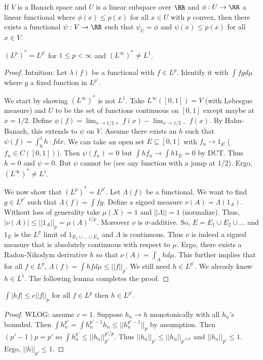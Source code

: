 \documentclass{../uva7310}
\begin{document}
\begin{thm}
    If $V$ is a Banach space and $U$ is a linear subspace over $\RR$ and $\phi:U\rightarrow\RR$ a linear functional
    where $\phi(x)\leq p(x)$ for all $x\in U$ with $p$ convex, then there exists a functional $\psi:V\rightarrow\RR$ such that
    $\psi_U=\phi$ and $\psi(x)\leq p(x)$ for all $x\in V$. 
\end{thm}

\begin{thm}
    $(L^p)^*=L^{p'}$ for $1\leq p<\infty$ and $(L^\infty)^*\neq L^1$.
\end{thm}

\begin{proof}
    Intuition: Let $\lambda(f)$ be a functional with $f\in L^p$. Identify it with $\int fgd\mu$ where $g$ a fixed function in $L^{p'}$.

    We start by showing $(L^\infty)^*$ is not $L^1$. Take $L^\infty([0,1])=V$ (with Lebesgue measure) and $U$ to be the set of functions continuous on $[0,1]$
    except maybe at $x=1/2$. Define $\phi(f)=\lim_{x\to 1/2 +} f(x)-\lim_{x\to 1/2 -}f(x)$. By Hahn-Banach, this extends to $\psi$ on $V$.
    Assume there exists an $h$ such that $\psi(f)=\int_0^1 h\cdot f d x$. We can take an open set $E\subseteq [0,1]$ with $f_n\to 1_E$ ($f_n\in C([0,1])$).
    Then $\psi(f_n)=0$ but $\int h f_n\to \int h 1_E=0$ by DCT. Thus $h=0$ and $\psi=0$. But $\psi$ cannot be (see any function with a jump at 1/2).
    Ergo, $(L^\infty)^*\neq L^1$.

    We now show that $(L^p)^*=L^{p'}$. Let $\Lambda(f)$ be a functional. We want to find $g\in L^{p'}$ such that $\Lambda(f)=\int fg$.
    Define a signed measure $\nu(A)=\Lambda (1_A)$. Without loss of generality take $\mu(X)=1$ and $||\Lambda||=1$ (normalize).
    Thus, $|\nu(A)|\leq ||1_A||_p=\mu(A)^{1/p}$. Moreover $\nu$ is $\sigma$-additive. So, $E=E_1\cup E_2\cup\ldots$ and
    $1_E$ is the $L^p$ limit of $1_{E_1\cup \dots\cup E_n}$ and $\Lambda$ is continuous. Thus $\nu$ is indeed a signed measure
    that is absolutely continuous with respect to $\mu$. Ergo, there exists a Radon-Nikodym derivative $h$ so that
    $\nu(A)=\int_A h d\mu$. This further implies that for all $f\in L^p$, $\Lambda(f)=\int hf d\mu\leq ||f||_p$. We still need $h\in L^{p'}$.
    We already know $h\in L^1$. The following lemma completes the proof.
\end{proof}

\begin{lemma}
    $\int |hf|\leq c||f||_p$ for all $f\in L^p$ then $h\in L^{p'}$.
\end{lemma}

\begin{proof}
    WLOG: assume $c=1$. Suppose $h_n\to h$ monotonically with all $h_n$'s bounded. Then $\int h_n^{p'}=\int h_n^{p'-1}h_n\leq ||h_n^{p'-1}||_p$ by
    assumption. Then $(p'-1)p=p'$ so $\int h_n^{p'}\leq ||h_n||_{p'}^{p'/p}$. Thus $||h_n||_{p'}\leq ||h_n||_{p'^{1/p}}$ and
    $||h_n||_{p'}\leq 1$. Ergo, $||h||_{p'}\leq 1$.
\end{proof}
\end{document}
